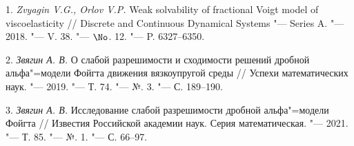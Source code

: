 
\litlist

1. {\it Zvyagin V.G., Orlov V.P.} Weak solvability of fractional Voigt model of viscoelasticity // Discrete and Continuous Dynamical Systems "--- Series A. "--- 2018. "--- V. 38. "--- $\No$. 12. "--- P. 6327--6350.

2. {\it Звягин А. В.} О слабой разрешимости и сходимости решений дробной альфа"=модели Фойгта движения вязкоупругой среды // Успехи математических наук. "--- 2019. "--- Т. 74. "--- №. 3. "--- С. 189--190.

3. {\it Звягин А. В.} Исследование слабой разрешимости дробной альфа"=модели Фойгта // Известия Российской академии наук. Серия математическая. "--- 2021. "--- Т. 85. "--- №. 1. "--- С. 66--97.
